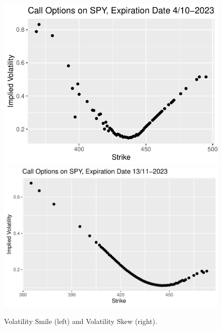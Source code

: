 \begin{figure}[H]
    \centering
    \includegraphics[scale=0.6]{fig/img/ImpliedVol/VolSmile20231003.pdf}
    \includegraphics[scale=0.52]{fig/img/ImpliedVol/VolSkewNov13.pdf}
    \caption{Volatility Smile (left) and Volatility Skew (right).}
    \label{fig:smileskew}
\end{figure}